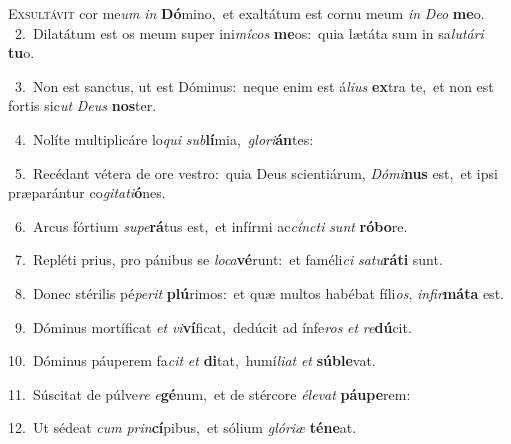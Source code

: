 \lettrine{\initial\textcolor{\initialcolor}{E}}{xsultávit} cor me\textit{um} \textit{in} \textbf{Dó}\-mino,~\star et exaltátum est cornu meum \textit{in} \textit{De}\-\textit{o} \textbf{me}\-o.\\
{\numbfont\textcolor{\numbcolor}{~2.}}~Dilatátum est os meum super ini\-\textit{mí}\-\textit{cos} \textbf{me}\-os:~\star quia lætáta sum in sa\-\textit{lu}\-\textit{tá}\textit{ri} \textbf{tu}\-o.\par
{\numbfont\textcolor{\numbcolor}{~3.}}~Non est sanctus, ut est Dóminus:~\dagger neque enim est á\-\textit{li}\-\textit{us} \textbf{ex}\-tra te,~\star et non est fortis sic\textit{ut} \textit{De}\-\textit{us} \textbf{nos}\-ter.\par
{\numbfont\textcolor{\numbcolor}{~4.}}~Nolíte multiplicáre lo\textit{qui} \textit{sub}\-\textbf{lí}mia,~\star \textit{glo}\-\textit{ri}\textbf{án}tes:\par
{\numbfont\textcolor{\numbcolor}{~5.}}~Recédant vétera de ore vestro:~\dagger quia Deus scientiárum, \textit{Dó}\-\textit{mi}\textbf{nus} est,~\star et ipsi præparántur co\-\textit{gi}\-\textit{ta}\textit{ti}\textbf{ó}nes.\par
{\numbfont\textcolor{\numbcolor}{~6.}}~Arcus fórtium \textit{su}\-\textit{pe}\textbf{rá}tus est,~\star et infírmi ac\-\textit{cínc}\-\textit{ti} \textit{sunt} \textbf{ró}\-\textbf{bo}re.\par
{\numbfont\textcolor{\numbcolor}{~7.}}~Repléti prius, pro pánibus se \textit{lo}\-\textit{ca}\textbf{vé}runt:~\star et faméli\textit{ci} \textit{sa}\-\textit{tu}\textbf{rá}\textbf{ti} sunt.\par
{\numbfont\textcolor{\numbcolor}{~8.}}~Donec stérilis pé\-\textit{pe}\-\textit{rit} \textbf{plú}\-rimos:~\star et quæ multos habébat fíli\-\textit{os}\-, \textit{in}\-\textit{fir}\textbf{má}\textbf{ta} est.\par
{\numbfont\textcolor{\numbcolor}{~9.}}~Dóminus mortíficat \textit{et} \textit{vi}\-\textbf{ví}ficat,~\star dedúcit ad ínfe\textit{ros} \textit{et} \textit{re}\-\textbf{dú}cit.\par
{\numbfont\textcolor{\numbcolor}{10.}}~Dóminus páuperem fa\textit{cit} \textit{et} \textbf{di}\-tat,~\star humí\-\textit{li}\-\textit{at} \textit{et} \textbf{súb}\-\textbf{le}vat.\par
{\numbfont\textcolor{\numbcolor}{11.}}~Súscitat de púlve\textit{re} \textit{e}\-\textbf{gé}num,~\star et de stércore \textit{é}\-\textit{le}\textit{vat} \textbf{páu}\-\textbf{pe}rem:\par
{\numbfont\textcolor{\numbcolor}{12.}}~Ut sédeat \textit{cum} \textit{prin}\-\textbf{cí}pibus,~\star et sólium \textit{gló}\-\textit{ri}\textit{æ} \textbf{té}\-\textbf{ne}at.\par
